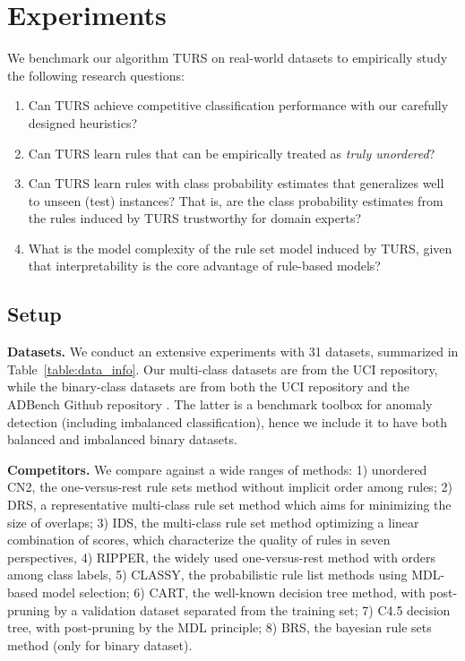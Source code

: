  
\section{Experiments} \label{sec:exp}
We benchmark our algorithm TURS on real-world datasets to empirically study the following research questions: 
\begin{enumerate}
     \vspace{-0.2cm}\item Can TURS achieve competitive classification performance with our carefully designed heuristics?
     \vspace{-0.2cm}\item Can TURS learn rules that can be empirically treated as \emph{truly unordered}? 
     \vspace{-0.2cm}\item Can TURS learn rules with class probability estimates that generalizes well to unseen (test) instances? That is, are the class probability estimates from the rules induced by TURS trustworthy for domain experts?
     \vspace{-0.2cm}\item What is the model complexity of the rule set model induced by TURS, given that interpretability is the core advantage of rule-based models?
\end{enumerate}

\subsection{Setup}
\textbf{Datasets.} We conduct an extensive experiments with 31 datasets, summarized in Table~\ref{table:data_info}. Our multi-class datasets are from the UCI repository, while the binary-class datasets are from both the UCI repository and the ADBench Github repository \citep{han2022adbench}. The latter is a benchmark toolbox for anomaly detection (including imbalanced classification), hence we include it to have both balanced and imbalanced binary datasets.

\noindent
\textbf{Competitors.} We compare against a wide ranges of methods: 1) unordered CN2, the one-versus-rest rule sets method without implicit order among rules; 2) DRS, a representative multi-class rule set method which aims for minimizing the size of overlaps; 3) IDS, the multi-class rule set method optimizing a linear combination of scores, which characterize the quality of rules in seven perspectives, 4) RIPPER, the widely used one-versus-rest method with orders among class labels, 5) CLASSY, the probabilistic rule list methods using MDL-based model selection; 6) CART, the well-known decision tree method, with post-pruning by a validation dataset separated from the training set; 7) C4.5 decision tree, with post-pruning by the MDL principle; 8) BRS, the bayesian rule sets method (only for binary dataset). 

